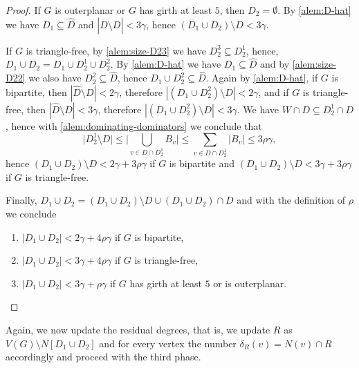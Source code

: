 \begin{proof}
If $G$ is outerplanar or $G$ has girth at least $5$, then $D_2=\emptyset$.
By \ref{alem:D-hat} we have $D_1\subseteq \hat{D}$ and
$|\hat{D}\setminus D|<3\gamma$, hence $(D_1\cup D_2)\setminus D<3\gamma$.

If $G$ is triangle-free, by \ref{alem:size-D23} we have $D_2^3\subseteq D_2^1$, hence,
  $D_1\cup D_2=D_1\cup D_2^1\cup D_2^2$. By \ref{alem:D-hat} we have
  $D_1 \subseteq \hat D$ and by \ref{alem:size-D22} we also have
  $D_2^2 \subseteq \hat D$, hence $D_1\cup D_2^2\subseteq \hat D$.
  Again by \ref{alem:D-hat}, if $G$ is bipartite, then
  $|\hat D \setminus D|<2\gamma$, therefore $|(D_1 \cup D_2^2 )\setminus D| < 2\gamma$, and if $G$ is triangle-free,
  then $|\hat D \setminus D|<3\gamma$,
  therefore $|(D_1 \cup D_2^2 )\setminus D| < 3\gamma$.
  We have $W\cap D\subseteq D_2^1\cap D$, hence with
  \ref{alem:dominating-dominators} we conclude that
  \[
    \big\vert D_2^1 \setminus D \big\vert \leq
    \Big\vert\bigcup\limits_{v\in D \cap D_2^1}B_v\Big\vert \leq
    \sum\limits_{v\in D \cap D_2^1} |B_v| \leq 3\rho\gamma,
  \]
  hence $(D_1\cup D_2)\setminus D<2\gamma+3\rho\gamma$ if
  $G$ is bipartite and $(D_1\cup D_2)\setminus D<3\gamma+3\rho\gamma$
  if $G$ is triangle-free.

  Finally,
  $D_1\cup D_2=(D_1\cup D_2)\setminus D\cup (D_1\cup D_2)\cap D$ and
  with the definition of $\rho$ we conclude

  \vspace{-2mm}
  \begin{enumerate}
  \item $|D_1\cup D_2|<2\gamma + 4\rho\gamma$ if $G$ is bipartite, \smallskip
  \item $|D_1\cup D_2|<3\gamma + 4\rho\gamma$ if $G$ is triangle-free, \smallskip
  \item $|D_1\cup D_2|<3\gamma + \rho\gamma$ if $G$ has girth at least
  $5$ or is outerplanar.
  \end{enumerate}

\end{proof}

Again, we now update the residual degrees, that is, we update
$R$ as $V(G)\setminus N[D_1\cup D_2]$ and for every vertex the
number $\delta_R(v)=N(v)\cap R$ accordingly and proceed with
the third phase.


